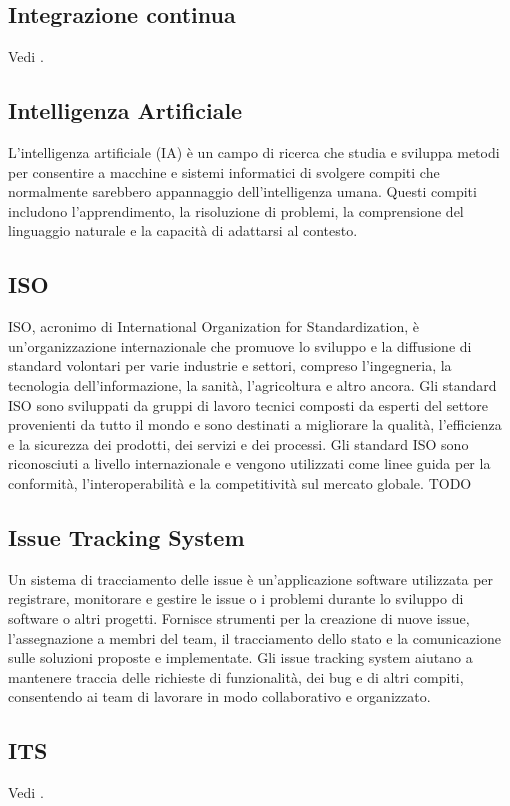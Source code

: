 \vspace{2em}
\subsection*{Integrazione continua}
\par Vedi .

\vspace{2em}
\subsection*{Intelligenza Artificiale}
\par L'intelligenza artificiale (IA) è un campo di ricerca che studia e sviluppa metodi per consentire a macchine e sistemi informatici di svolgere compiti che normalmente sarebbero appannaggio dell'intelligenza umana. Questi compiti includono l'apprendimento, la risoluzione di problemi, la comprensione del linguaggio naturale e la capacità di adattarsi al contesto.

\vspace{2em}
\subsection*{ISO}
\par ISO, acronimo di International Organization for Standardization, è un'organizzazione internazionale che promuove lo sviluppo e la diffusione di standard volontari per varie industrie e settori, compreso l'ingegneria, la tecnologia dell'informazione, la sanità, l'agricoltura e altro ancora. Gli standard ISO sono sviluppati da gruppi di lavoro tecnici composti da esperti del settore provenienti da tutto il mondo e sono destinati a migliorare la qualità, l'efficienza e la sicurezza dei prodotti, dei servizi e dei processi. Gli standard ISO sono riconosciuti a livello internazionale e vengono utilizzati come linee guida per la conformità, l'interoperabilità e la competitività sul mercato globale.
TODO

\vspace{2em}
\subsection*{Issue Tracking System}
\par Un sistema di tracciamento delle issue è un'applicazione software utilizzata per registrare, monitorare e gestire le issue o i problemi durante lo sviluppo di software o altri progetti. Fornisce strumenti per la creazione di nuove issue, l'assegnazione a membri del team, il tracciamento dello stato e la comunicazione sulle soluzioni proposte e implementate. Gli issue tracking system aiutano a mantenere traccia delle richieste di funzionalità, dei bug e di altri compiti, consentendo ai team di lavorare in modo collaborativo e organizzato.

\vspace{2em}
\subsection*{ITS}
\par Vedi .
